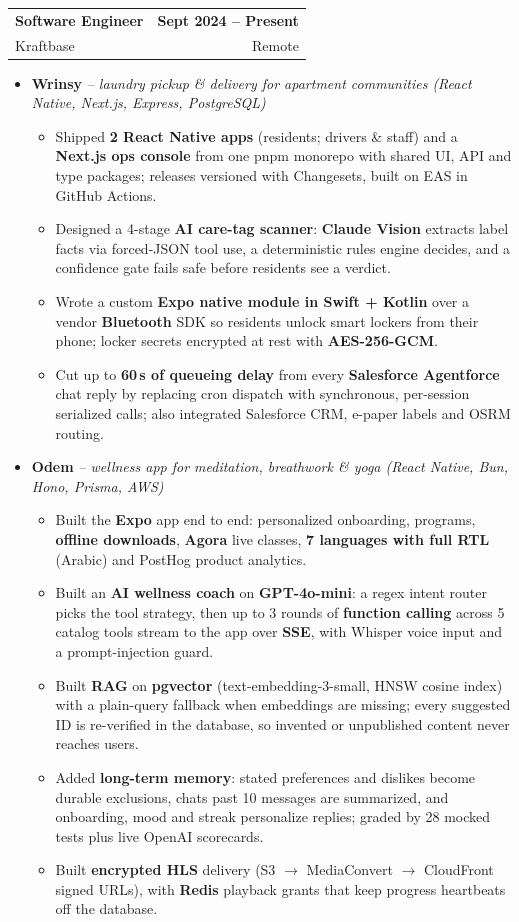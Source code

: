 \documentclass[a4paper,10pt]{article}
\makeatletter
\newcommand{\resumeItem}[1]{\item\small{#1\vspace{-2pt}}}
\newcommand{\resumeRole}[4]{
  \vspace{-1pt}\item
  \begin{tabular*}{\textwidth}[t]{l@{\extracolsep{\fill}}r}
    \textbf{#1} & \small\textbf{#2} \\
    \small{#3} & \small{#4} \\
  \end{tabular*}\vspace{-6pt}
}
\newcommand{\resumeProduct}[2]{
  \item[]\vspace{-2pt}\small{\textbf{#1} \textit{-- #2}}\vspace{-4pt}
}
\newcommand{\resumeListStart}{\begin{itemize}[leftmargin=0.15in, label={}]}
\newcommand{\resumeListEnd}{\end{itemize}}
\newcommand{\resumeItemsStart}{\begin{itemize}[leftmargin=0.2in, itemsep=0pt, label=\textbullet]}
\newcommand{\resumeItemsEnd}{\end{itemize}\vspace{-4pt}}
\makeatother
\begin{document}
  \resumeRole{Software Engineer}{Sept 2024 -- Present}{Kraftbase}{Remote}
  \resumeListStart
    \resumeProduct{Wrinsy}{laundry pickup \& delivery for apartment communities (React Native, Next.js, Express, PostgreSQL)}
    \resumeItemsStart
      \resumeItem{Shipped \textbf{2 React Native apps} (residents; drivers \& staff) and a \textbf{Next.js ops console} from one pnpm monorepo with shared UI, API and type packages; releases versioned with Changesets, built on EAS in GitHub Actions.}
      \resumeItem{Designed a 4-stage \textbf{AI care-tag scanner}: \textbf{Claude Vision} extracts label facts via forced-JSON tool use, a deterministic rules engine decides, and a confidence gate fails safe before residents see a verdict.}
      \resumeItem{Wrote a custom \textbf{Expo native module in Swift + Kotlin} over a vendor \textbf{Bluetooth} SDK so residents unlock smart lockers from their phone; locker secrets encrypted at rest with \textbf{AES-256-GCM}.}
      \resumeItem{Cut up to \textbf{60\,s of queueing delay} from every \textbf{Salesforce Agentforce} chat reply by replacing cron dispatch with synchronous, per-session serialized calls; also integrated Salesforce CRM, e-paper labels and OSRM routing.}
    \resumeItemsEnd

    \resumeProduct{Odem}{wellness app for meditation, breathwork \& yoga (React Native, Bun, Hono, Prisma, AWS)}
    \resumeItemsStart
      \resumeItem{Built the \textbf{Expo} app end to end: personalized onboarding, programs, \textbf{offline downloads}, \textbf{Agora} live classes, \textbf{7 languages with full RTL} (Arabic) and PostHog product analytics.}
      \resumeItem{Built an \textbf{AI wellness coach} on \textbf{GPT-4o-mini}: a regex intent router picks the tool strategy, then up to 3 rounds of \textbf{function calling} across 5 catalog tools stream to the app over \textbf{SSE}, with Whisper voice input and a prompt-injection guard.}
      \resumeItem{Built \textbf{RAG} on \textbf{pgvector} (text-embedding-3-small, HNSW cosine index) with a plain-query fallback when embeddings are missing; every suggested ID is re-verified in the database, so invented or unpublished content never reaches users.}
      \resumeItem{Added \textbf{long-term memory}: stated preferences and dislikes become durable exclusions, chats past 10 messages are summarized, and onboarding, mood and streak personalize replies; graded by 28 mocked tests plus live OpenAI scorecards.}
      \resumeItem{Built \textbf{encrypted HLS} delivery (S3 $\rightarrow$ MediaConvert $\rightarrow$ CloudFront signed URLs), with \textbf{Redis} playback grants that keep progress heartbeats off the database.}
    \resumeItemsEnd
  \resumeListEnd
\end{document}

